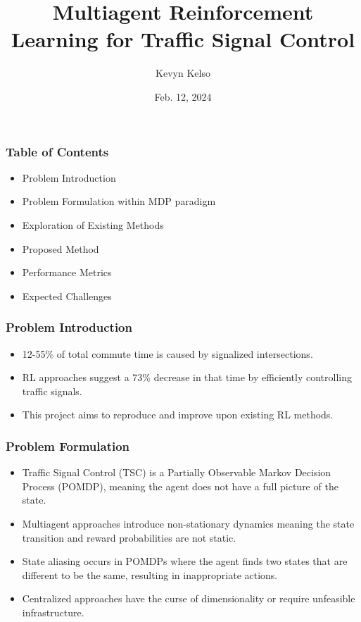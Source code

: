\documentclass[compress,12pt]{beamer}
\title{Multiagent Reinforcement Learning for Traffic Signal Control}
\date{Feb. 12, 2024}
\author{Kevyn Kelso}
\institute{University of Colorado at Colorado Springs}
\begin{document}
\frame[plain]{\titlepage}


\begin{frame}[bg=arguelles.png]
      \frametitle{Table of Contents}
      \begin{itemize}
      \item Problem Introduction
      \item Problem Formulation within MDP paradigm
      \item Exploration of Existing Methods
      \item Proposed Method
      \item Performance Metrics
      \item Expected Challenges
      \end{itemize}
\end{frame}

\begin{frame}[bg=arguelles.png]
      \frametitle{Problem Introduction}
      \begin{itemize}
      \item 12-55\% of total commute time is caused by signalized intersections.
      \item RL approaches suggest a 73\% decrease in that time by efficiently controlling traffic signals.
      \item This project aims to reproduce and improve upon existing RL methods.
      \end{itemize}
\end{frame}



\begin{frame}[bg=arguelles.png]
      \frametitle{Problem Formulation}
      \begin{itemize}
      \item Traffic Signal Control (TSC) is a Partially Observable Markov Decision Process (POMDP), meaning the agent does not have a full picture of the state.
      \item Multiagent approaches introduce non-stationary dynamics meaning the state transition and reward probabilities are not static.
      \item State aliasing occurs in POMDPs where the agent finds two states that are different to be the same, resulting in inappropriate actions. 
      \item Centralized approaches have the curse of dimensionality or require unfeasible infrastructure.
      \end{itemize}
\end{frame}
\end{document}
